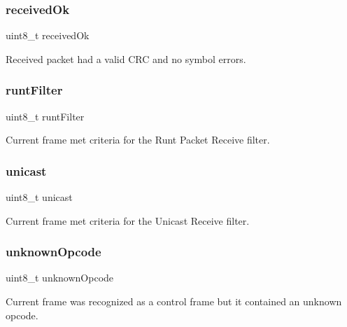 \mbox{\label{struct_r_s_v_a864bac3376c79921741bdde1db0d7570}} 
\subsubsection{\texorpdfstring{receivedOk}{receivedOk}}
{\footnotesize\ttfamily uint8\+\_\+t received\+Ok}



Received packet had a valid C\+RC and no symbol errors. 

\mbox{\label{struct_r_s_v_a27d64356a19179a097c7973f7d7a46a5}} 
\subsubsection{\texorpdfstring{runtFilter}{runtFilter}}
{\footnotesize\ttfamily uint8\+\_\+t runt\+Filter}



Current frame met criteria for the Runt Packet Receive filter. 

\mbox{\label{struct_r_s_v_ab2a20bde35ec4242bf38d69c8277114a}} 
\subsubsection{\texorpdfstring{unicast}{unicast}}
{\footnotesize\ttfamily uint8\+\_\+t unicast}



Current frame met criteria for the Unicast Receive filter. 

\mbox{\label{struct_r_s_v_a57538bc935cb3aac5c51829f01b013af}} 
\subsubsection{\texorpdfstring{unknownOpcode}{unknownOpcode}}
{\footnotesize\ttfamily uint8\+\_\+t unknown\+Opcode}



Current frame was recognized as a control frame but it contained an unknown opcode. 


